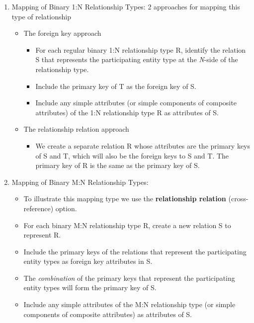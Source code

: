 \documentclass[10pt]{article}
\begin{document}
\begin{enumerate}
	\item Mapping of Binary 1:N Relationship Types: 2 approaches for mapping this type of relationship
		\begin{itemize}
			\item The foreign key approach
			\begin{itemize}
				\item For each regular binary 1:N relationship type R, identify the relation S that represents the participating entity type at the \textit{N}-side of the relationship type.
				\item Include the primary key of T as the foreign key of S.
				\item Include any simple attributes (or simple components of composite attributes) of the 1:N relationship type R as attributes of S.
			\end{itemize}

			\item The relationship relation approach
				\begin{itemize}
					\item We create a separate relation R whose attributes are the primary keys of S and T, which will also be the foreign keys to S and T. The primary key of R is the same as the primary key of S.
				\end{itemize}
		\end{itemize}

	\item Mapping of Binary M:N Relationship Types:
		\begin{itemize}
			\item To illustrate this mapping type we use the \textbf{relationship relation} (cross-reference) option.
			\item For each binary M:N relationship type R, create a new relation S to represent R.
			\item Include the primary keys of the relations that represent the participating entity types as  foreign key attributes in S.
			\item The \textit{combination} of the primary keys that represent the participating entity types will form the primary key of S.
			\item Include any simple attributes of the M:N relationship type (or simple components of composite attributes) as attributes of S.
		\end{itemize}


\end{enumerate}
\end{document}
